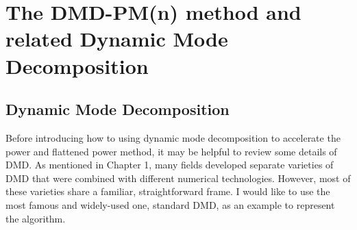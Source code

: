 \cleardoublepage

\chapter{The DMD-PM(n) method and related Dynamic Mode Decomposition}
\label{chapter:DMD-PM}
\section{Dynamic Mode Decomposition}
Before introducing how to using dynamic mode decomposition to accelerate the power and flattened power method, it may be helpful to review some details of DMD.
As mentioned in Chapter 1, many fields developed separate varieties of DMD that were combined with different numerical technologies.
However, most of these varieties share a familiar, straightforward frame. I would like to use the most famous and widely-used one, standard DMD, as an example to represent the algorithm.

